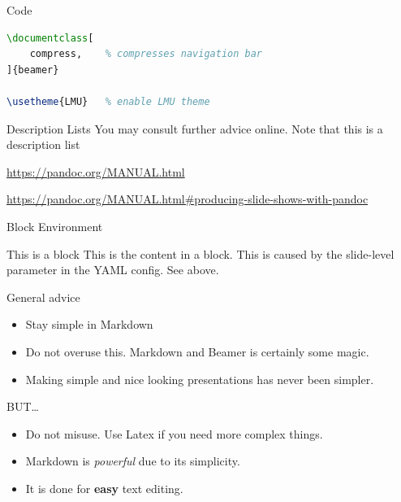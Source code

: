 \documentclass[
  fleqn,compress,utf8,aspectratio=169,t,
]{beamer}
\providecommand{\tightlist}{%
  \setlength{\itemsep}{0pt}\setlength{\parskip}{0pt}}
\begin{document}
\begin{frame}[fragile]{Code}
\protect\hypertarget{code}{}
\begin{lstlisting}[language=TeX]
\documentclass[
    compress,    % compresses navigation bar
]{beamer}

\usetheme{LMU}   % enable LMU theme
\end{lstlisting}
\end{frame}

\begin{frame}{Description Lists}
\protect\hypertarget{description-lists}{}
You may consult further advice online. Note that this is a description
list

\begin{description}
\tightlist
\item[pandoc]
\url{https://pandoc.org/MANUAL.html}
\item[beamer]
\url{https://pandoc.org/MANUAL.html\#producing-slide-shows-with-pandoc}
\end{description}
\end{frame}

\begin{frame}{Block Environment}
\protect\hypertarget{block-environment}{}
\begin{block}{This is a block}
\protect\hypertarget{this-is-a-block}{}
This is the content in a block. This is caused by the slide-level
parameter in the YAML config. See above.
\end{block}
\end{frame}

\begin{frame}{General advice}
\protect\hypertarget{general-advice}{}
\begin{itemize}
\tightlist
\item
  Stay simple in Markdown
\item
  Do not overuse this. Markdown and Beamer is certainly some magic.
\item
  Making simple and nice looking presentations has never been simpler.
\end{itemize}

BUT\ldots{}

\pause

\begin{itemize}
\tightlist
\item
  Do not misuse. Use Latex if you need more complex things.
\item
  Markdown is \emph{powerful} due to its simplicity.
\item
  It is done for \textbf{easy} text editing.
\end{itemize}
\end{frame}
\end{document}
